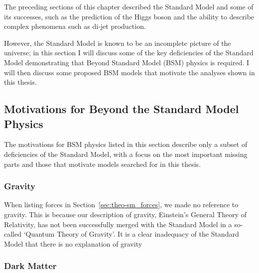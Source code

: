The preceding sections of this chapter described the Standard Model
and some of its successes,
such as the prediction of the Higgs boson and the ability to describe complex phenomena such as di-jet production.

However, the Standard Model is known to be an incomplete picture of the universe;
in this section I will discuss some of the key deficiencies of the Standard Model demonstrating
that Beyond Standard Model (BSM) physics is required.
I will then discuss some proposed BSM models that motivate the analyses shown in this thesis.

\subsection{Motivations for Beyond the Standard Model Physics}

The motivations for BSM physics listed in this section
describe only a subset of deficiencies of the Standard Model,
with a focus on the most important missing parts and
those that motivate models searched for in this thesis.

\subsubsection{Gravity}

When listing forces in Section~\ref{sec:theo-sm_forces}, we made no reference to gravity.
This is because our description of gravity, Einstein's General Theory of Relativity,
has not been successfully merged with the Standard Model in a so-called `Quantum Theory of Gravity'.
It is a clear inadequacy of the Standard Model that there is no explanation of gravity

\subsubsection{Dark Matter}
\label{sec:theo_bsm_dm}


